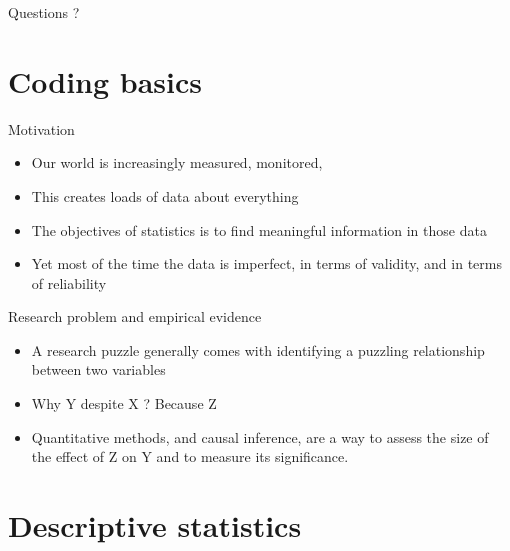 \documentclass[
  ignorenonframetext,
]{beamer}
\providecommand{\tightlist}{%
  \setlength{\itemsep}{0pt}\setlength{\parskip}{0pt}}
\begin{document}
\begin{frame}{Questions ?}
\label{questions}
\end{frame}

\section{Coding basics}\label{coding-basics}

\begin{frame}{Motivation}
\label{motivation}
\begin{itemize}
\tightlist
\item
  Our world is increasingly measured, monitored,
\item
  This creates loads of data about everything
\item
  The objectives of statistics is to find meaningful information in
  those data
\item
  Yet most of the time the data is imperfect, in terms of validity, and
  in terms of reliability
\end{itemize}
\end{frame}

\begin{frame}{Research problem and empirical evidence}
\label{research-problem-and-empirical-evidence}
\begin{itemize}
\tightlist
\item
  A research puzzle generally comes with identifying a puzzling
  relationship between two variables
\item
  Why Y despite X ? Because Z
\item
  Quantitative methods, and causal inference, are a way to assess the
  size of the effect of Z on Y and to measure its significance.
\end{itemize}
\end{frame}

\section{Descriptive statistics}\label{descriptive-statistics}
\end{document}
